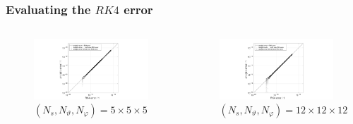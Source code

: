 \documentclass{beamer}
\begin{document}
\begin{frame}
\frametitle{Evaluating the $RK4$ error}
\vspace{-1.5cm}
\begin{columns}[onlytextwidth]
	\begin{column}{0.5\textwidth}
		\begin{center}
			\begin{figure}
				\includegraphics[trim={9cm 0cm 10cm 0cm},clip,width=1\textwidth]{FIGURES/RK4_alpha555_SFC.pdf}
				\caption{$(N_s,N_\vartheta,N_\varphi)= 5\times5\times5$}
				
			\end{figure}
		\end{center}
	\end{column}
	\begin{column}{0.5\textwidth}
		\vspace{0cm}
		\begin{center}
			\begin{figure}
				\includegraphics[trim={9cm 0cm 10cm 0cm},clip,width=1\textwidth]{FIGURES/RK4_alpha121212_SFC.pdf}
				\caption{$(N_s,N_\vartheta,N_\varphi)= 12\times12\times12$}
			\end{figure}
		\end{center}
	\end{column}
\end{columns}
\end{frame}
\end{document}

